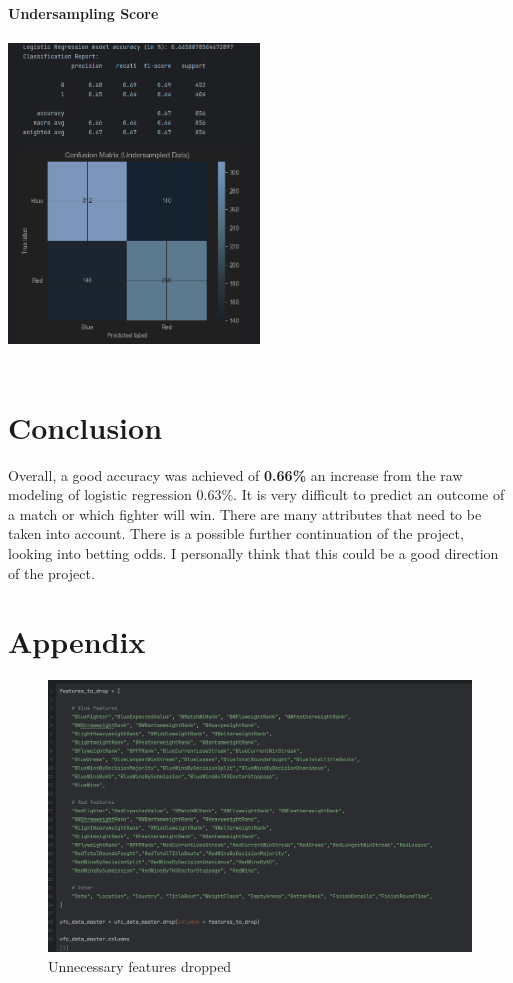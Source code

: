 \documentclass{article}
\begin{document}
	{\large \textbf{Undersampling Score}}\\\\
	\includegraphics[width=0.5\textwidth]{images/Undersampling_score.png}\\\\
\section{Conclusion}
Overall, a good accuracy was achieved of \textbf{0.66\%} an increase from the raw modeling of logistic regression 0.63\%. It is very difficult to predict an outcome of a match or which fighter will win. There are many attributes that need to be taken into account. There is a possible further continuation of the project, looking into betting odds. I personally think that this could be a good direction of the project.\\
\section{Appendix}
	\begin{figure}[H]
	\centering
	\includegraphics[width=1\textwidth]{images/Features_Dropped.png}
	\caption{Unnecessary features dropped}
	\label{fig:features_dropped}
	\end{figure}
\end{document}
